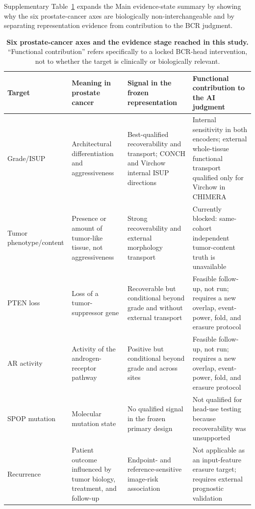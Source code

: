 

Supplementary Table~\ref{tab:supp-six-axis-evidence-stage} expands the Main evidence-state summary by
showing why the six prostate-cancer axes are biologically non-interchangeable and by
separating representation evidence from contribution to the BCR judgment.

\begin{table}[H]
\centering
\scriptsize
\setlength{\tabcolsep}{3pt}
\renewcommand{\arraystretch}{1.22}
\caption{\textbf{Six prostate-cancer axes and the evidence stage reached in this study.}
``Functional contribution'' refers specifically to a locked BCR-head intervention, not to
whether the target is clinically or biologically relevant.}
\label{tab:supp-six-axis-evidence-stage}
\begin{tabular}{@{}p{}p{}p{}p{}@{}}
\toprule
Target & Meaning in prostate cancer & Signal in the frozen representation & Functional contribution to the AI judgment \\
\midrule
Grade/ISUP & Architectural differentiation and aggressiveness & Best-qualified recoverability and transport; CONCH and Virchow internal ISUP directions & Internal sensitivity in both encoders; external whole-tissue functional transport qualified only for Virchow in CHIMERA \\
Tumor phenotype/content & Presence or amount of tumor-like tissue, not aggressiveness & Strong recoverability and external morphology transport & Currently blocked: same-cohort independent tumor-content truth is unavailable \\
PTEN loss & Loss of a tumor-suppressor gene & Recoverable but conditional beyond grade and without external transport & Feasible follow-up, not run; requires a new overlap, event-power, fold, and erasure protocol \\
AR activity & Activity of the androgen-receptor pathway & Positive but conditional beyond grade and across sites & Feasible follow-up, not run; requires a new overlap, event-power, fold, and erasure protocol \\
SPOP mutation & Molecular mutation state & No qualified signal in the frozen primary design & Not qualified for head-use testing because recoverability was unsupported \\
Recurrence & Patient outcome influenced by tumor biology, treatment, and follow-up & Endpoint- and reference-sensitive image-risk association & Not applicable as an input-feature erasure target; requires external prognostic validation \\
\bottomrule
\end{tabular}
\end{table}


